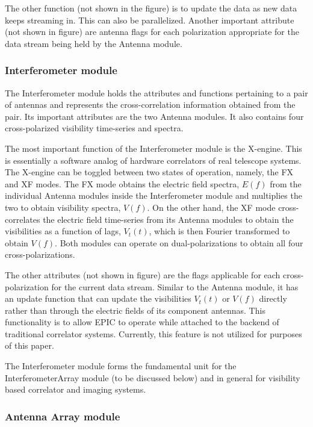 \documentclass[a4paper,fleqn,usenatbib]{../mnras}
\begin{document}
The other function (not shown in the figure) is to update the data as new data 
keeps streaming in. This can also be parallelized. Another important attribute
(not shown in figure) are antenna flags for each polarization appropriate for 
the data stream being held by the Antenna module. 

\subsubsection{Interferometer module}

The Interferometer module holds the attributes and functions pertaining to
a pair of antennas and represents the cross-correlation information obtained
from the pair. Its important attributes are the two Antenna modules. It also
contains four cross-polarized visibility time-series and spectra. 

The most important function of the Interferometer module is the X-engine. 
This is essentially a software analog of hardware correlators of real 
telescope systems. The X-engine can be toggled between two states of operation,
namely, the FX and XF modes. The FX mode obtains the electric field spectra, 
$E(f)$ from the individual Antenna modules inside the Interferometer module and
multiplies the two to obtain visibility spectra, $V(f)$. On the other hand, the
XF mode cross-correlates the electric field time-series from its Antenna modules
to obtain the visibilities as a function of lags, $V_t(t)$, which is then Fourier 
transformed to obtain $V(f)$. Both modules can operate on dual-polarizations to
obtain all four cross-polarizations.

The other attributes (not shown in figure) are the flags applicable for each
cross-polarization for the current data stream. Similar to the Antenna module,
it has an update function that can update the visibilities $V_t(t)$ or $V(f)$
directly rather than through the electric fields of its component antennas. 
This functionality is to allow EPIC to operate while attached to the backend 
of traditional correlator systems. Currently, this feature is not utilized 
for purposes of this paper.

The Interferometer module forms the fundamental unit for the InterferometerArray
module (to be discussed below) and in general for visibility based correlator 
and imaging systems. 

\subsubsection{Antenna Array module}
\end{document}
